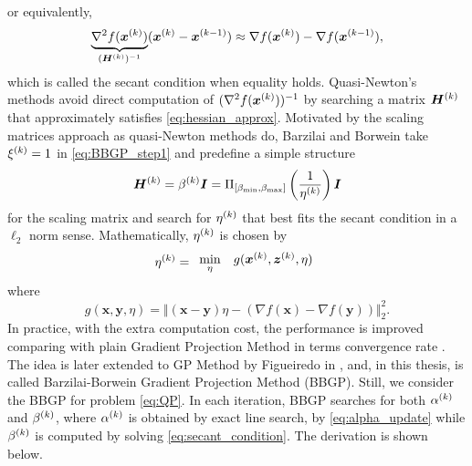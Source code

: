 or equivalently,
\begin{equation}
    \underbrace{\nabla^2 f(\bm x^{(k)})}_{(\bm H^{(k)})^{-1}}
    (\bm x^{(k)} - \bm x^{(k-1)})
    \approx \nabla f(\bm x^{(k)}) - \nabla f(\bm x^{(k-1)}),
    \label{eq:hessian_approx}
\end{equation}
which is called the secant condition when equality holds.
Quasi-Newton's methods avoid direct computation of
$(\nabla^2f(\bm x^{(k)}))^{-1}$ by searching a matrix $\bm H^{(k)}$ that
approximately satisfies \eqref{eq:hessian_approx}.
Motivated by the scaling matrices approach as quasi-Newton methods do,
Barzilai and Borwein take $\xi^{(k)} = 1$ in \eqref{eq:BBGP_step1} and
predefine a simple structure
\begin{equation}
    \bm H^{(k)} =
    \beta^{(k)} \bm I =
    \Pi_{[\beta_{\min},\beta_{\max}]} \left( \frac{1}{\eta^{(k)}} \right) \bm I
\end{equation}
for the scaling matrix and search for $\eta^{(k)}$ that best fits the secant
condition in a $\ell_2$ norm sense.
Mathematically, $\eta^{(k)}$ is chosen by
\begin{equation}
    \eta^{(k)} =
    \begin{array}{cl}
        \underset{\eta}{\min} &
        g(\bm x^{(k)},\bm z^{(k)},\eta)
    \end{array}
    \label{eq:secant_condition}
\end{equation}
where
\begin{equation}
    g(\bm x,\bm y,\eta)
    =
    \Vert (\bm x-\bm y)\eta-(\nabla f(\bm x)-\nabla f(\bm y)) \Vert_2^2.
\end{equation}
In practice, with the extra computation cost, the performance is improved
comparing with plain Gradient Projection Method in terms convergence rate
\cite{BARZILAI_BORWEIN_ALGORITHM}.
The idea is later extended to GP Method by Figueiredo \etal in
\cite{GRAD_PROJ_FOR_SR_APPL_TO_CS_AND_INV_PROBLEMS}, and, in this thesis, is
called Barzilai-Borwein Gradient Projection Method (BBGP).
Still, we consider the BBGP for problem \eqref{eq:QP}.
In each iteration, BBGP searches for both $\alpha^{(k)}$ and $\beta^{(k)}$,
where $\alpha^{(k)}$ is obtained by exact line search, \ie by
\eqref{eq:alpha_update} while $\beta^{(k)}$ is computed by solving
\eqref{eq:secant_condition}.
The derivation is shown below.
